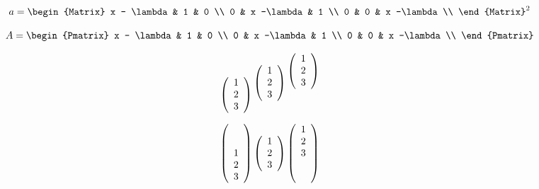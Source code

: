 \documentclass [spanish,12pt]{article}
\begin{document}
\vspace{.1in}

\[ a = {\begin{Matrix}
x - \lambda & 1 & 0 \\
0 & x -\lambda & 1 \\
0 & 0 & x -\lambda \\
\end{Matrix}
}^2
\]

\vspace{.1in}

\[ A = \begin{Pmatrix}
x - \lambda & 1 & 0 \\
0 & x -\lambda & 1 \\
0 & 0 & x -\lambda \\
\end{Pmatrix}
\]

\vspace{.1in}


\[ \begin{array}[t]({c})1\\2\\3 \end{array}
 \begin{array}[c]({c})1\\2\\3 \end{array}
 \begin{array}[b]({c})1\\2\\3 \end{array}
\]

\vspace{.1in}
\[  \left(
\begin{array}[t]{c}1\\2\\3\end{array}
\right)
\left(
\begin{array}[c]{c}1\\2\\3\end{array}
\right)
\left(
\begin{array}[b]{c}1\\2\\3\end{array}
\right)
\]
\end{document}
